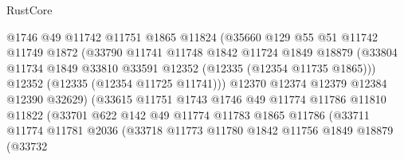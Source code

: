 \begin{lexlean}{RustCore}
\begin{coremodule}
                              @1746
                              @49
                              @11742
                              @11751
                              @1865
                              @11824
                              (@35660
                                @129
                                @55
                                @51
                                @11742
                                @11749
                                @1872
                                (@33790
                                  @11741
                                  @11748
                                  @1842
                                  @11724
                                  @1849
                                  @18879
                                  (@33804
                                    @11734
                                    @1849
                                    @33810
                                    @33591
                                    @12352
                                    (@12335 (@12354 @11735 @1865)))
                                  @12352
                                  (@12335 (@12354 @11725 @11741)))
                                @12370
                                @12374
                                @12379
                                @12384
                                @12390
                                @32629)
                              (@33615
                                @11751
                                @1743
                                @1746
                                @49
                                @11774
                                @11786
                                @11810
                                @11822
                                (@33701
                                  @622
                                  @142
                                  @49
                                  @11774
                                  @11783
                                  @1865
                                  @11786
                                  (@33711
                                    @11774
                                    @11781
                                    @2036
                                    (@33718
                                      @11773
                                      @11780
                                      @1842
                                      @11756
                                      @1849
                                      @18879
                                      (@33732

\end{coremodule}
\end{lexlean}

